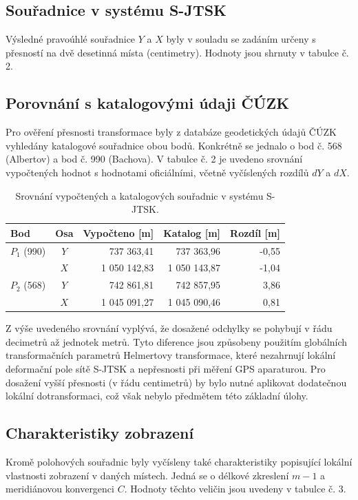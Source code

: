 \documentclass[12pt]{article}
\begin{document}
\subsection{Souřadnice v systému S-JTSK}
Výsledné pravoúhlé souřadnice $Y$ a $X$ byly v souladu se zadáním určeny s přesností na dvě desetinná místa (centimetry). Hodnoty jsou shrnuty v tabulce č. 2.

\subsection{Porovnání s katalogovými údaji ČÚZK}
Pro ověření přesnosti transformace byly z databáze geodetických údajů ČÚZK vyhledány katalogové souřadnice obou bodů. Konkrétně se jednalo o bod č. 568 (Albertov) a bod č. 990 (Bachova). V tabulce č. 2 je uvedeno srovnání vypočtených hodnot s hodnotami oficiálními, včetně vyčíslených rozdílů $dY$ a $dX$.

\begin{table}[h!]
\centering
\begin{tabular}{|l|c|r|r|r|}
\hline
\textbf{Bod} & \textbf{Osa} & \textbf{Vypočteno [m]} & \textbf{Katalog [m]} & \textbf{Rozdíl [m]} \\ \hline
$P_1$ (990) & $Y$ & 737 363,41 & 737 363,96 & -0,55 \\ 
 & $X$ & 1 050 142,83 & 1 050 143,87 & -1,04 \\ \hline
$P_2$ (568) & $Y$ & 742 861,81 & 742 857,95 & 3,86 \\ 
 & $X$ & 1 045 091,27 & 1 045 090,46 & 0,81 \\ \hline
\end{tabular}
\caption{Srovnání vypočtených a katalogových souřadnic v systému S-JTSK.}
\end{table}

Z výše uvedeného srovnání vyplývá, že dosažené odchylky se pohybují v řádu decimetrů až jednotek metrů. Tyto diference jsou způsobeny použitím globálních transformačních parametrů Helmertovy transformace, které nezahrnují lokální deformační pole sítě S-JTSK a nepřesnosti při měření GPS aparaturou. Pro dosažení vyšší přesnosti (v řádu centimetrů) by bylo nutné aplikovat dodatečnou lokální dotransformaci, což však nebylo předmětem této základní úlohy.

\subsection{Charakteristiky zobrazení}
Kromě polohových souřadnic byly vyčísleny také charakteristiky popisující lokální vlastnosti zobrazení v daných místech. Jedná se o délkové zkreslení $m-1$ a meridiánovou konvergenci $C$. Hodnoty těchto veličin jsou uvedeny v tabulce č. 3.
\end{document}
